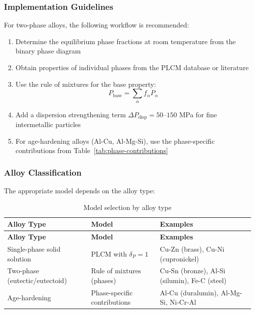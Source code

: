 \documentclass[12pt,a4paper]{article}
\begin{document}
	\subsubsection{Implementation Guidelines}
	
	For two-phase alloys, the following workflow is recommended:
	
	\begin{enumerate}
		\item Determine the equilibrium phase fractions at room temperature from the binary phase diagram
		\item Obtain properties of individual phases from the PLCM database or literature
		\item Use the rule of mixtures for the base property:
		\[
		P_{\text{base}} = \sum_{\alpha} f_{\alpha} P_{\alpha}
		\]
		\item Add a dispersion strengthening term \(\Delta P_{\text{disp}} = 50\text{--}150\) MPa for fine intermetallic particles
		\item For age-hardening alloys (Al-Cu, Al-Mg-Si), use the phase-specific contributions from Table~\ref{tab:phase-contributions}
	\end{enumerate}
	
	\subsubsection{Alloy Classification}
	
	The appropriate model depends on the alloy type:
	
	\begin{longtable}{p{4cm}p{3cm}p{6cm}}
		\caption{Model selection by alloy type} \label{tab:alloy-classification} \\
		\toprule
		\textbf{Alloy Type} & \textbf{Model} & \textbf{Examples} \\
		\midrule
		\endfirsthead
		\toprule
		\textbf{Alloy Type} & \textbf{Model} & \textbf{Examples} \\
		\midrule
		\endhead
		Single-phase solid solution & PLCM with \(\delta_P = 1\) & Cu-Zn (brass), Cu-Ni (cupronickel) \\
		Two-phase (eutectic/eutectoid) & Rule of mixtures (phases) & Cu-Sn (bronze), Al-Si (silumin), Fe-C (steel) \\
		Age-hardening & Phase-specific contributions & Al-Cu (duralumin), Al-Mg-Si, Ni-Cr-Al \\
		\bottomrule
	\end{longtable}
	
\end{document}
